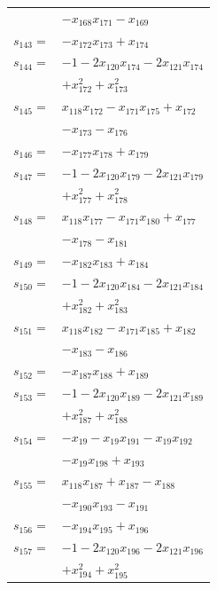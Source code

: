 \begin{longtable}{@{}r@{\;}l@{}}
 & \(\displaystyle -x_{168}x_{171} -x_{169}\) \\[3pt]
\(s_{143}=\) & \(\displaystyle -x_{172}x_{173} +x_{174}\) \\[3pt]
\(s_{144}=\) & \(\displaystyle -1 -2x_{120}x_{174} -2x_{121}x_{174}\) \\
 & \(\displaystyle +x_{172}^{2} +x_{173}^{2}\) \\[3pt]
\(s_{145}=\) & \(\displaystyle x_{118}x_{172} -x_{171}x_{175} +x_{172}\) \\
 & \(\displaystyle -x_{173} -x_{176}\) \\[3pt]
\(s_{146}=\) & \(\displaystyle -x_{177}x_{178} +x_{179}\) \\[3pt]
\(s_{147}=\) & \(\displaystyle -1 -2x_{120}x_{179} -2x_{121}x_{179}\) \\
 & \(\displaystyle +x_{177}^{2} +x_{178}^{2}\) \\[3pt]
\(s_{148}=\) & \(\displaystyle x_{118}x_{177} -x_{171}x_{180} +x_{177}\) \\
 & \(\displaystyle -x_{178} -x_{181}\) \\[3pt]
\(s_{149}=\) & \(\displaystyle -x_{182}x_{183} +x_{184}\) \\[3pt]
\(s_{150}=\) & \(\displaystyle -1 -2x_{120}x_{184} -2x_{121}x_{184}\) \\
 & \(\displaystyle +x_{182}^{2} +x_{183}^{2}\) \\[3pt]
\(s_{151}=\) & \(\displaystyle x_{118}x_{182} -x_{171}x_{185} +x_{182}\) \\
 & \(\displaystyle -x_{183} -x_{186}\) \\[3pt]
\(s_{152}=\) & \(\displaystyle -x_{187}x_{188} +x_{189}\) \\[3pt]
\(s_{153}=\) & \(\displaystyle -1 -2x_{120}x_{189} -2x_{121}x_{189}\) \\
 & \(\displaystyle +x_{187}^{2} +x_{188}^{2}\) \\[3pt]
\(s_{154}=\) & \(\displaystyle -x_{19} -x_{19}x_{191} -x_{19}x_{192}\) \\
 & \(\displaystyle -x_{19}x_{198} +x_{193}\) \\[3pt]
\(s_{155}=\) & \(\displaystyle x_{118}x_{187} +x_{187} -x_{188}\) \\
 & \(\displaystyle -x_{190}x_{193} -x_{191}\) \\[3pt]
\(s_{156}=\) & \(\displaystyle -x_{194}x_{195} +x_{196}\) \\[3pt]
\(s_{157}=\) & \(\displaystyle -1 -2x_{120}x_{196} -2x_{121}x_{196}\) \\
 & \(\displaystyle +x_{194}^{2} +x_{195}^{2}\) \\[3pt]

\end{longtable}
